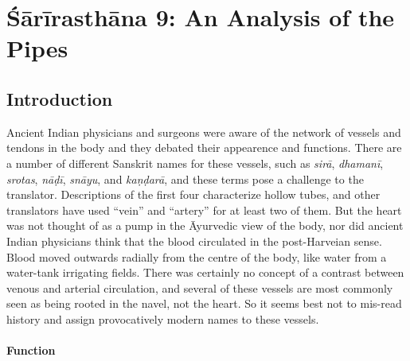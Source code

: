 
\chapter{Śārīrasthāna 9:  An Analysis of the Pipes}

\section{Introduction}

%
%
%
%
%
%

Ancient Indian physicians and surgeons were aware of the network of
vessels and tendons in the body and they debated their appearence and
functions. There are a number of different Sanskrit names for these
vessels, such as \emph{sirā}, \emph{dhamanī}, \emph{srotas},
\emph{nāḍī}, \emph{snāyu}, and \emph{kaṇḍarā}, and these terms pose a
challenge to the translator.  Descriptions of the first four
characterize hollow tubes, and other translators have used “vein” and
“artery” for at least two of them.  But the heart was not thought of
as a pump in the Āyurvedic view of the body, nor did ancient Indian
physicians think that the blood circulated in the post-Harveian sense.
Blood moved outwards radially from the centre of the body, like water
from a water-tank irrigating fields.  There was certainly no concept
of a contrast between venous and arterial circulation, and several of
these vessels are most commonly seen as being rooted in the navel, not
the heart.  So it seems best not to mis-read history and assign provocatively
modern names to these vessels.

\subsubsection{Function}


